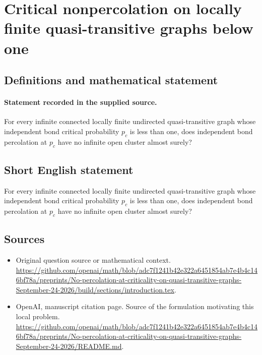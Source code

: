 \documentclass[11pt]{article}
\begin{document}
\section*{Critical nonpercolation on locally finite quasi-transitive graphs below one}\label{30007381}
\subsection{Definitions and mathematical statement}
\paragraph{Statement recorded in the supplied source.}
For every infinite connected locally finite undirected quasi-transitive graph whose independent bond critical probability $p_c$ is less than one, does independent bond percolation at $p_c$ have no infinite open cluster almost surely?
\subsection{Short English statement}
For every infinite connected locally finite undirected quasi-transitive graph whose independent bond critical probability $p_c$ is less than one, does independent bond percolation at $p_c$ have no infinite open cluster almost surely?
\subsection{Sources}
\begin{itemize}
\item[S1] Original question source or mathematical context.
\url{https://github.com/openai/math/blob/adc7f1241b42e322a6451854ab7e4b4c146bf78a/preprints/No-percolation-at-criticality-on-quasi-transitive-graphs-September-24-2026/build/sections/introduction.tex}.
\item[S2] OpenAI, manuscript citation page. Source of the formulation motivating this local problem.
\url{https://github.com/openai/math/blob/adc7f1241b42e322a6451854ab7e4b4c146bf78a/preprints/No-percolation-at-criticality-on-quasi-transitive-graphs-September-24-2026/README.md}.
\end{itemize}
\end{document}
